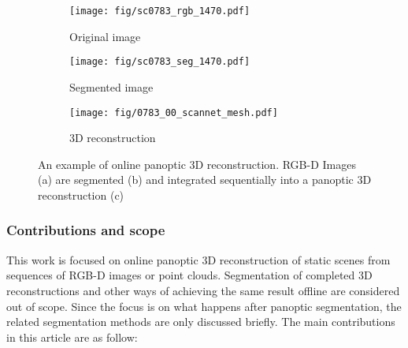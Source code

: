 \begin{figure}[t]
\centering
\begin{subfigure}[b]{0.32\textwidth}
        \centering
        \texttt{[image: fig/sc0783\_rgb\_1470.pdf]}
        \caption[]%
        {{\small Original image}}    
        \label{fig:intro_orig}
\end{subfigure}
\hfill
\begin{subfigure}[b]{0.32\textwidth}
        \centering
        \texttt{[image: fig/sc0783\_seg\_1470.pdf]}
        \caption[]%
        {{\small Segmented image}}    
        \label{fig:intro_2d_seg}
\end{subfigure}
\hfill
\begin{subfigure}[b]{0.32\textwidth}
        \centering
        \texttt{[image: fig/0783\_00\_scannet\_mesh.pdf]}
        \caption[]%
        {{\small 3D reconstruction}}    
        \label{fig:ntro_3d_seg}
\end{subfigure}
\caption[]{An example of online panoptic 3D reconstruction. RGB-D Images (a) are segmented (b) and integrated sequentially into a panoptic 3D reconstruction (c)}
\label{fig:intro_example}
\end{figure}




\subsubsection{Contributions and scope} This work is focused on online panoptic 3D reconstruction of static scenes from sequences of RGB-D images or point clouds. Segmentation of completed 3D reconstructions and other ways of achieving the same result offline are considered out of scope. Since the focus is on what happens after panoptic segmentation, the related segmentation methods are only discussed briefly. The main contributions in this article are as follow:

